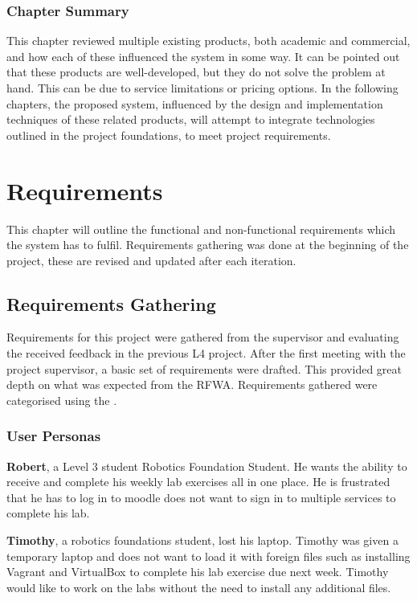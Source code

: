 \documentclass{l4proj}
\begin{document}
\subsection{Chapter Summary}

This chapter reviewed multiple existing products, both academic and commercial, and how each of these influenced the system in some way. It can be pointed out that these products are well-developed, but they do not solve the problem at hand. This can be due to service limitations or pricing options. In the following chapters, the proposed system, influenced by the design and implementation techniques of these related products, will attempt to integrate technologies outlined in the project foundations, to meet project requirements.



\chapter{Requirements}
This chapter will outline the functional and non-functional requirements which the system has to fulfil. Requirements gathering was done at the beginning of the project, these are revised and updated after each iteration. 

\section{Requirements Gathering}
Requirements for this project were gathered from the supervisor and evaluating the received feedback in the previous L4 project. After the first meeting with the project supervisor, a basic set of requirements were drafted. This provided great depth on what was expected from the RFWA. Requirements gathered were categorised using the \cite{Moscow}.

\subsection{User Personas}

\textbf{Robert}, a Level 3 student Robotics Foundation Student. He wants the ability to receive and complete his weekly lab exercises all in one place. He is frustrated that he has to log in to moodle does not want to sign in to multiple services to complete his lab. 

\textbf{Timothy}, a robotics foundations student, lost his laptop. Timothy was given a temporary laptop and does not want to load it with foreign files such as installing Vagrant and VirtualBox to complete his lab exercise due next week. Timothy would like to work on the labs without the need to install any additional files. 
\end{document}
